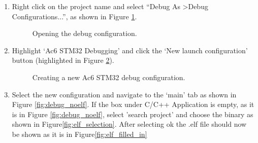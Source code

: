 \documentclass{UoNMCHA}
\numberwithin{equation}{section}
\begin{document}
\begin{enumerate}
    \item Right click on the project name and select ``Debug As \textgreater Debug Configurations...'', as shown in Figure \ref{fig:debugicon}.
    
    \begin{figure}[H]
    \caption{Opening the debug configuration.}
    \label{fig:debugicon}
    \end{figure}

    \item Highlight `Ac6 STM32 Debugging' and click the `New launch configuration' button (highlighted in Figure \ref{fig:debugconfig}).

    \begin{figure}[H]
    \caption{Creating a new Ac6 STM32 debug configuration.}
    \label{fig:debugconfig}
    \end{figure}


    \item Select the new configuration and navigate to the `main' tab as shown in Figure \ref{fig:debug_noelf}. If the box under C/C++ Application is empty,  as it is in Figure \ref{fig:debug_noelf}, select 'search project' and choose the binary as shown in  Figure\ref{fig:elf_selection}. After selecting ok the .elf file should now be shown as it is in Figure\ref{fig:elf_filled_in}
   

\end{enumerate}
\end{document}
